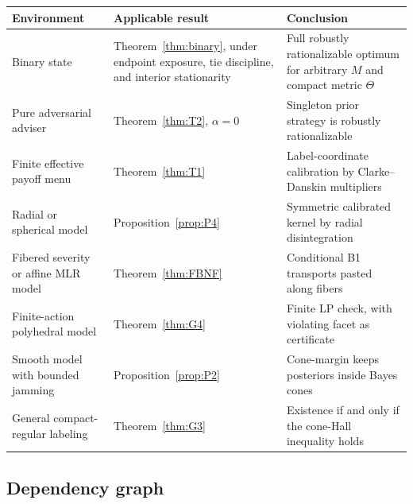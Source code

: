 \documentclass[11pt]{article}
\theoremstyle{definition}
\theoremstyle{remark}
\begin{document}
\begin{center}
\begin{tabular}{|p{}|p{}|p{}|}
\hline
Environment & Applicable result & Conclusion \\
\hline
Binary state & Theorem~\ref{thm:binary}, under endpoint exposure, tie discipline, and interior stationarity & Full robustly rationalizable optimum for arbitrary $M$ and compact metric $\Theta$ \\
\hline
Pure adversarial adviser & Theorem~\ref{thm:T2}, $\alpha=0$ & Singleton prior strategy is robustly rationalizable \\
\hline
Finite effective payoff menu & Theorem~\ref{thm:T1} & Label-coordinate calibration by Clarke--Danskin multipliers \\
\hline
Radial or spherical model & Proposition~\ref{prop:P4} & Symmetric calibrated kernel by radial disintegration \\
\hline
Fibered severity or affine MLR model & Theorem~\ref{thm:FBNF} & Conditional B1 transports pasted along fibers \\
\hline
Finite-action polyhedral model & Theorem~\ref{thm:G4} & Finite LP check, with violating facet as certificate \\
\hline
Smooth model with bounded jamming & Proposition~\ref{prop:P2} & Cone-margin keeps posteriors inside Bayes cones \\
\hline
General compact-regular labeling & Theorem~\ref{thm:G3} & Existence if and only if the cone-Hall inequality holds \\
\hline
\end{tabular}
\end{center}

\subsection{Dependency graph}
\end{document}

